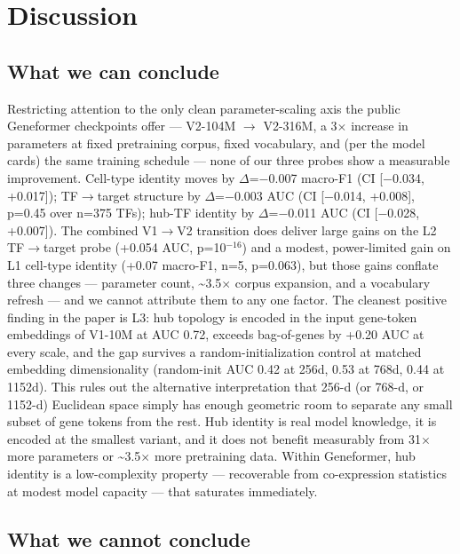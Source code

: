 \documentclass[
  11pt,
]{article}
\begin{document}
\section{Discussion}\label{discussion}

\subsection{What we can conclude}\label{what-we-can-conclude}

Restricting attention to the only clean parameter-scaling axis the
public Geneformer checkpoints offer --- V2-104M $\to$ V2-316M, a 3$\times$ increase
in parameters at fixed pretraining corpus, fixed vocabulary, and (per
the model cards) the same training schedule --- none of our three probes
show a measurable improvement. Cell-type identity moves by $\Delta$=$-$0.007
macro-F1 (CI {[}$-$0.034, +0.017{]}); TF$\to$target structure by $\Delta$=$-$0.003 AUC
(CI {[}$-$0.014, +0.008{]}, p=0.45 over n=375 TFs); hub-TF identity by
$\Delta$=$-$0.011 AUC (CI {[}$-$0.028, +0.007{]}). The combined V1$\to$V2 transition
does deliver large gains on the L2 TF$\to$target probe (+0.054 AUC, p=10$^{-16}$)
and a modest, power-limited gain on L1 cell-type identity (+0.07
macro-F1, n=5, p=0.063), but those gains conflate three changes ---
parameter count, \textasciitilde3.5$\times$ corpus expansion, and a vocabulary
refresh --- and we cannot attribute them to any one factor. The cleanest
positive finding in the paper is L3: hub topology is encoded in the
input gene-token embeddings of V1-10M at AUC 0.72, exceeds bag-of-genes
by +0.20 AUC at every scale, and the gap survives a
random-initialization control at matched embedding dimensionality
(random-init AUC 0.42 at 256d, 0.53 at 768d, 0.44 at 1152d). This rules
out the alternative interpretation that 256-d (or 768-d, or 1152-d)
Euclidean space simply has enough geometric room to separate any small
subset of gene tokens from the rest. Hub identity is real model
knowledge, it is encoded at the smallest variant, and it does not
benefit measurably from 31$\times$ more parameters or \textasciitilde3.5$\times$ more
pretraining data. Within Geneformer, hub identity is a low-complexity
property --- recoverable from co-expression statistics at modest model
capacity --- that saturates immediately.

\subsection{What we cannot
conclude}\label{what-we-cannot-conclude}
\end{document}
